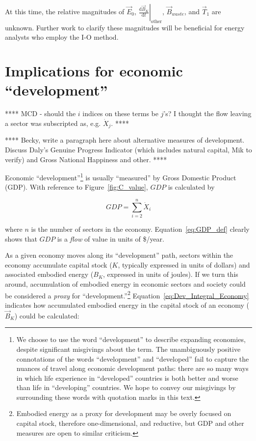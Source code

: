 At this time, the relative magnitudes of $\vec{E}_{0}$,
$\left. \frac{\mathrm{d}\vec{B}_{K}}{\mathrm{d}t} \right|_{\mathrm{other}}$,
$\vec{B}_{waste}$, and $\vec{T}_{1}$ are unknown. 
Further work to clarify these magnitudes will be beneficial
for energy analysts who employ the I-O method.
 

\section{Implications for economic ``development''}
\label{sec:implications_for_development}

**** MCD - should the $i$ indices on these terms be $j$'s? I thought the flow
leaving a sector was subscripted as, e.g. $\dot{X}_{j}$. ****

**** Becky, write a paragraph here about alternative measures of development. 
Discuss Daly's Genuine Progress Indicator (which includes natural capital, Mik to verify)
and Gross National Happiness and other. ****

Economic ``development''\footnote{We choose to use the word ``development'' to
describe expanding economies, despite significant misgivings about the term. 
The unambiguously positive connotations of the words ``development'' and ``developed''
fail to capture the nuances of travel along economic development paths:
there are so many ways in which life experience in ``developed'' countries 
is both better and worse than life in ``developing'' countries.
We hope to convey our misgivings by surrounding these words with quotation marks in this text.}
is usually ``measured''
by Gross Domestic Product (GDP).
With reference to Figure~\ref{fig:C_value}, $GDP$ is calculated by

\begin{equation} \label{eq:GDP_def}
	GDP
	= \sum\limits_{i=2}^{n} \dot{X}_{i}
\end{equation}

\noindent{}where $n$ is the number of sectors in the economy.
Equation~\ref{eq:GDP_def} clearly shows that 
$GDP$ is a \emph{flow} of value in units of \$/year.

As a given economy moves along its ``development'' path,
sectors within the economy accumulate capital stock 
($K$, typically expressed in units of dollars)
and associated embodied energy 
($B_{K}$, expressed in units of joules).
If we turn this around, 
accumulation of embodied energy in economic sectors and society 
could be considered a \emph{proxy} for ``development.''\footnote{Embodied energy 
as a proxy for development may be overly focused on capital stock, 
therefore one-dimensional, and reductive, 
but GDP and other measures are open to similar criticism.}
Equation~\ref{eq:Dev_Integral_Economy} indicates how accumulated
embodied energy in the capital stock 
of an economy ($\vec{B}_{K}$) could be calculated:

